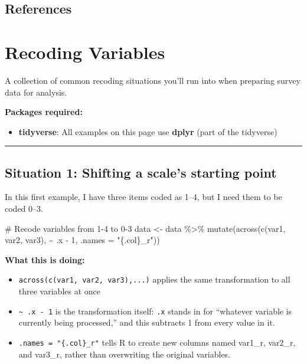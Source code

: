 \documentclass[
  letterpaper,
  DIV=11,
  numbers=noendperiod]{scrreprt}
\newenvironment{Shaded}{\begin{snugshade}}{\end{snugshade}}
\newcommand{\AttributeTok}[1]{\textcolor[rgb]{0.40,0.45,0.13}{#1}}
\newcommand{\CommentTok}[1]{\textcolor[rgb]{0.37,0.37,0.37}{#1}}
\newcommand{\DecValTok}[1]{\textcolor[rgb]{0.68,0.00,0.00}{#1}}
\newcommand{\FunctionTok}[1]{\textcolor[rgb]{0.28,0.35,0.67}{#1}}
\newcommand{\NormalTok}[1]{\textcolor[rgb]{0.00,0.23,0.31}{#1}}
\newcommand{\OtherTok}[1]{\textcolor[rgb]{0.00,0.23,0.31}{#1}}
\newcommand{\SpecialCharTok}[1]{\textcolor[rgb]{0.37,0.37,0.37}{#1}}
\newcommand{\StringTok}[1]{\textcolor[rgb]{0.13,0.47,0.30}{#1}}
\providecommand{\tightlist}{%
  \setlength{\itemsep}{0pt}\setlength{\parskip}{0pt}}\usepackage{longtable,booktabs,array}
\begin{document}
\section{References}\label{references-2}

\chapter{Recoding Variables}\label{recoding-variables}

A collection of common recoding situations you'll run into when
preparing survey data for analysis.

\textbf{Packages required:}

\begin{itemize}
\tightlist
\item
  \textbf{tidyverse}: All examples on this page use \textbf{dplyr} (part
  of the tidyverse)
\end{itemize}

\begin{center}\rule{0.5\linewidth}{0.5pt}\end{center}

\section{\texorpdfstring{\textbf{Situation 1: Shifting a scale's
starting
point}}{Situation 1: Shifting a scale's starting point}}\label{situation-1-shifting-a-scales-starting-point}

In this first example, I have three items coded as 1--4, but I need them
to be coded 0--3.

\begin{Shaded}
\begin{Highlighting}[]
\CommentTok{\# Recode variables from 1{-}4 to 0{-}3}
\NormalTok{data }\OtherTok{\textless{}{-}}\NormalTok{ data }\SpecialCharTok{\%\textgreater{}\%}
  \FunctionTok{mutate}\NormalTok{(}\FunctionTok{across}\NormalTok{(}\FunctionTok{c}\NormalTok{(var1, var2, var3), }\SpecialCharTok{\textasciitilde{}}\NormalTok{ .x }\SpecialCharTok{{-}} \DecValTok{1}\NormalTok{, }\AttributeTok{.names =} \StringTok{"\{.col\}\_r"}\NormalTok{))}
\end{Highlighting}
\end{Shaded}

\textbf{What this is doing:}

\begin{itemize}
\item
  \texttt{across(c(var1,\ var2,\ var3),...)} applies the same
  transformation to all three variables at once
\item
  \texttt{\textasciitilde{}\ .x\ -\ 1} is the transformation itself:
  \texttt{.x} stands in for ``whatever variable is currently being
  processed,'' and this subtracts 1 from every value in it.
\item
  \texttt{.names\ =\ "\{.col\}\_r"} tells R to create new columns named
  var1\_r, var2\_r, and var3\_r, rather than overwriting the original
  variables.
\end{itemize}
\end{document}
